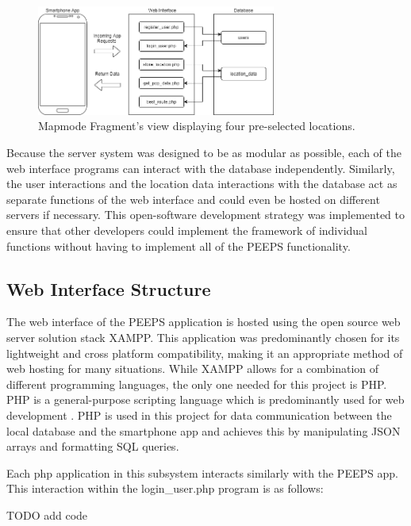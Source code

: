 \begin{figure}[ht]
    \centering
    \includegraphics[width=0.7\textwidth]{figures/ServerSubsystemInteraction.png}
    \caption{Mapmode Fragment's view displaying four pre-selected locations.}
    \label{fig:server_subsystem_interaction}
\end{figure}

Because the server system was designed to be as modular as possible, each of the web interface programs can interact with the database independently. Similarly, the user interactions and the location data interactions with the database act as separate functions of the web interface and could even be hosted on different servers if necessary. This open-software development strategy was implemented to ensure that other developers could implement the framework of individual functions without having to implement all of the PEEPS functionality.

\subsection{Web Interface Structure}

The web interface of the PEEPS application is hosted using the open source web server solution stack XAMPP. This application was predominantly chosen for its lightweight and cross platform compatibility, making it an appropriate method of web hosting for many situations. While XAMPP allows for a combination of different programming languages, the only one needed for this project is PHP. PHP is a general-purpose scripting language which is predominantly used for web development \cite{ThePHPGroup}. PHP is used in this project for data communication between the local database and the smartphone app and achieves this by manipulating JSON arrays and formatting SQL queries. 

Each php application in this subsystem interacts similarly with the PEEPS app. This interaction within the login\_user.php program is as follows:

TODO add code

